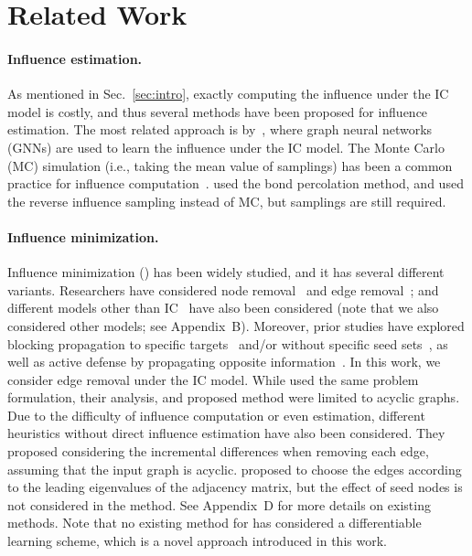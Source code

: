 \section{Related Work}
\label{sec:related}
\paragraph{Influence estimation.}
As mentioned in Sec.~\ref{sec:intro},
exactly computing the influence under the IC model is costly, and thus
several methods have been proposed for influence estimation.
The most related approach is by~\citet{ko2020monstor}, where graph neural networks (GNNs) are used to learn the influence under the IC model.
The Monte Carlo (MC) simulation (i.e., taking the mean value of samplings) has been a common practice for influence computation~\citep{zhou2013ublf,yang2019influence,manouchehri2021temporal}.
\citet{Kimura2009blocking} used the bond percolation method, and \citet{yi2022edge} used the reverse influence sampling instead of MC, but samplings are still required.

\paragraph{Influence minimization.}
Influence minimization (\influenceMinimization) has been widely studied, and it has several different variants.
Researchers have considered node removal~\citep{zhu2021misinformation, ni2023misinformation}
and edge removal~\citep{Kimura2009blocking, tong2012gelling};
and different models other than IC~\citep{dai2022minimizing} have also been considered (note that we also considered other models; see Appendix~B).
Moreover, prior studies have explored blocking propagation to specific targets~\citep{jiang2022rumordecay,wang2020efficient} and/or without specific seed sets~\citep{zareie2022rumour}, as well as
active defense by propagating opposite information~\citep{budak2011limiting, luo2014time}.
In this work, we consider edge removal under the IC model. While
\citet{yan2019rumor} used the same problem formulation, their analysis, and proposed method were limited to acyclic graphs.
Due to the difficulty of influence computation or even estimation, different heuristics without direct influence estimation have also been considered.
They proposed considering the incremental differences when removing each edge, assuming that the input graph is acyclic.
\citet{tong2012gelling} proposed to choose the edges according to the leading eigenvalues of the adjacency matrix, but the effect of seed nodes is not considered in the method.
See Appendix~D 
for more details on existing \influenceMinimization methods.
Note that no existing method for \influenceMinimization has considered a differentiable learning scheme, which is a novel approach introduced in this work.